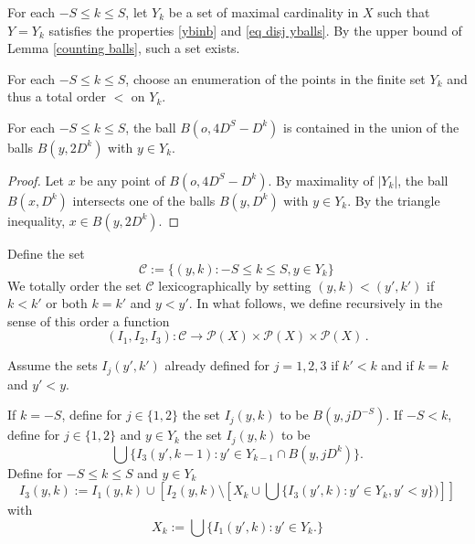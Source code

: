 For each $-S\le k\le S$, let $Y_k$ be a set of
maximal cardinality in $X$ such that $Y=Y_k$ satisfies
the properties \eqref{ybinb} and \eqref{eq disj yballs}.
By the upper bound of Lemma \ref{counting balls}, such a set exists.

For each $-S\le k\le S$, choose an enumeration of the points in the finite set $Y_k$ and thus a total
order  $<$ on $Y_{k}$.

\begin{lemma}
\label{cover big ball}
  For each $-S\le k\le S$, the ball
  $B(o, 4D^S-D^k)$ is contained
  in the union of the balls $B(y,2D^k)$ with $y\in Y_k$.
\end{lemma}

\begin{proof}
Let $x$ be any point of $B(o, 4D^S-D^k)$.   By maximality of $|Y_k|$, the ball
$B(x,  D^k)$ intersects one of the balls
$B(y,  D^k)$ with $y\in Y_k$. By the triangle
inequality, $x\in B(y,2D^k)$.
\end{proof}

Define the set
\begin{equation}
    \mathcal{C}:= \{(y,k): -S\le k\le S, y\in Y_k\}\,
\end{equation}
We totally order the set $\mathcal{C}$ lexicographically by setting
$(y,k)<(y',k')$ if $k< k'$ or both $k=k'$ and $y<y'$.
In what follows, we define recursively in the sense of this order a function
\begin{equation}
    (I_1,I_2,I_3): \mathcal{C}\to \mathcal{P}(X)\times \mathcal{P}(X)\times \mathcal{P}(X)\, .
\end{equation}


Assume the sets ${I}_j(y',k')$ already defined  for $j=1,2,3$ if $k'<k$ and if  $k=k$ and $y'<y$.




If $k=-S$, define for  $j\in \{1,2\}$ the set
${I}_j(y,k)$ to be $B(y,jD^{-S})$.
If $-S<k$, define for $j\in \{1,2\}$
and $y\in Y_k$ the set ${I}_j(y,k)$ to be
\begin{equation}\label{defineij}
\bigcup\{I_3(y',k-1):
y'\in Y_{k-1}\cap  B(y,jD^k)\}.
\end{equation}
Define for {$-S\leq k\leq S$} and $y\in Y_k$
\begin{equation}\label{definei3}
I_3(y,k):={I_1}(y,k)\cup \left[{I_2}(y,k)\setminus \left[X_k\cup \bigcup\{I_3(y',k):y'\in Y_{k}, y'<y\})\right]\right]
\end{equation}
with
\begin{equation}
      X_{k}:=\bigcup\{I_1(y', k):y'\in Y_{k} .\}
\end{equation}


